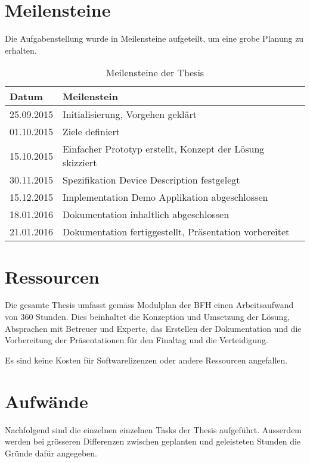 \section{Meilensteine}

Die Aufgabenstellung wurde in Meilensteine aufgeteilt, um eine grobe Planung zu erhalten.

\begin{table}[H]
\begin{tabularx}{\textwidth}{|l|X|}

 \hline \rowcolor{lightgray}
 {\bf Datum } & {\bf Meilenstein } \\  \hline
 
 25.09.2015  &   Initialisierung, Vorgehen geklärt      \\ \hline
 01.10.2015  &   Ziele definiert      \\ \hline
 15.10.2015  &   Einfacher Prototyp erstellt, Konzept der Lösung skizziert     \\ \hline
 30.11.2015  &   Spezifikation Device Description festgelegt     \\ \hline
 15.12.2015  &   Implementation Demo Applikation abgeschlossen     \\ \hline
 18.01.2016  &   Dokumentation inhaltlich abgeschlossen      \\ \hline
 21.01.2016  &   Dokumentation fertiggestellt, Präsentation vorbereitet     \\ \hline
 
\end{tabularx}
\caption{Meilensteine der Thesis}
\end{table}


\section{Ressourcen}

Die gesamte Thesis umfasst gemäss Modulplan der BFH einen Arbeitsaufwand von 360 Stunden. Dies beinhaltet die Konzeption und Umsetzung der Lösung, Absprachen mit Betreuer und Experte, das Erstellen der Dokumentation und die Vorbereitung der Präsentationen für den Finaltag und die Verteidigung.

Es sind keine Kosten für Softwarelizenzen oder andere Ressourcen angefallen.


\section{Aufwände}
Nachfolgend sind die einzelnen einzelnen Tasks der Thesis aufgeführt. Ausserdem werden bei grösseren Differenzen zwischen geplanten und geleisteten Stunden die Gründe dafür angegeben.

